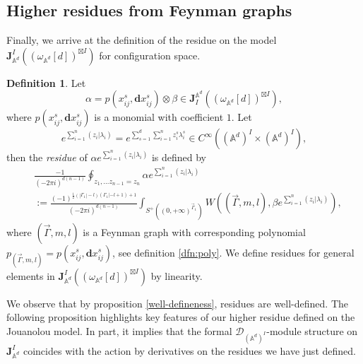 \documentclass[11pt]{amsart}
\theoremstyle{definition}
\newtheorem{defn}[thm]{Definition}
\theoremstyle{remark}
\numberwithin{equation}{section}
\begin{document}
\subsection{Higher residues from Feynman graphs}

Finally, we arrive at the definition of the residue on the model $\mathbf{J}^{ I}_{\mathbb{A}^{d}}((\omega_{\mathbb{A}
^{d}}[d])^{\boxtimes I})$ for configuration space.

\begin{defn}\label{dfn:res}
    Let
    $$
    \alpha=p(x_{ij}^{s},\mathbf{d}x_{ij}^{s})\otimes\beta\in \mathbf{J}_{ I}^{\mathbb{A}^{d}}((\omega_{\mathbb{A}^{d}}[d])^{\boxtimes I}),
    $$
    where $p(x_{ij}^{s},\mathbf{d}x_{ij}^{s})$ is a monomial with coefficient $1$.
    Let
    $$
    e^{\sum\limits_{i=1}^{n}(z_{i}|\lambda_{i})}=e^{\sum\limits_{s=1}^{d}\sum\limits_{i=1}^{n}z^{s}_{i}\lambda^{s}_{i}}\in C^{\infty}((\mathbb{A}^{d})^{ I}\times (\mathbb{A}^{d})^{ I}),
    $$
    then the \textit{residue} of $\alpha e^{\sum\limits_{i=1}^{n}(z_{i}|\lambda_{i})}$ is defined by
    \begin{align*}
        &\frac{-1}{(-2\pi i)^{d(n-1)}}\oint_{z_{1},\dots z_{n-1}=z_{n}}\alpha e^{\sum\limits_{i=1}^{n}(z_{i}|\lambda_{i})}\\
        &:=\frac{(-1)^{\frac{1}{2}(|\Gamma_{1}|-l)(\Gamma_{1}|-l+1)+1}}{(-2\pi i)^{d(n-1)}}\int_{S^{+}((0,+\infty)^{\vec{\Gamma}_{1}})}W((\vec{\Gamma},m,l),\beta e^{\sum\limits_{i=1}^{n}(z_{i}|\lambda_{i})}),
    \end{align*}
    where $(\vec{\Gamma},m,l)$ is a Feynman graph with corresponding polynomial $p_{(\vec{\Gamma},m,l)}=p(x_{ij}^{s},
    \mathbf{d}x_{ij}^{s})$, see definition \ref{dfn:poly}.
    We define residues for general elements in $\mathbf{J}^{ I}_{\mathbb{A}^{d}}((\omega_{\mathbb{A}^{d}}[d])^{\boxtimes
    I})$ by linearity.
\end{defn}


We observe that by proposition \ref{well-defineness}, residues are well-defined.
The following proposition highlights key features of our higher residue defined on the Jouanolou model.
In part, it implies that the formal $\mathcal{D}_{(\mathbb{A}^{d})^{ I}}$-module structure on $\mathbf{J}^{ I}_{\mathbb{A}^{d}}$ coincides with the action by derivatives on the residues we have just defined.
\end{document}
